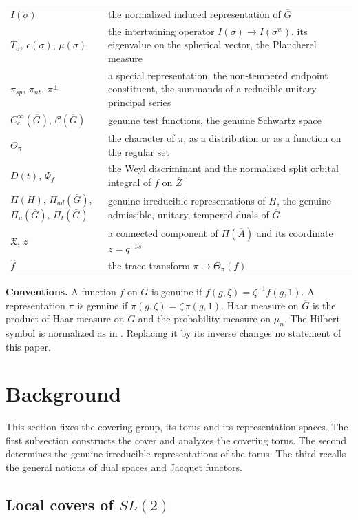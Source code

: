 \documentclass[12pt,letterpaper]{article}
\numberwithin{equation}{section}
\theoremstyle{definition}
\newcommand{\bG}{\overline{G}}
\newcommand{\bA}{\overline{A}}
\newcommand{\bZ}{\overline{Z}}
\newcommand{\calC}{\mathcal C}
\newcommand{\fX}{\mathfrak X}
\newcommand{\Pia}{\Pi_{ad}(\bG)}
\newcommand{\Piu}{\Pi_{u}(\bG)}
\newcommand{\Pit}{\Pi_{t}(\bG)}
\begin{document}
{\begin{longtable}{@{}>{\raggedright}p{4.3cm}>{\raggedright\arraybackslash}p{11.3cm}@{}}
$I(\sigma)$ & the normalized induced representation of $\bG$ \\
$T_\sigma$, $c(\sigma)$, $\mu(\sigma)$ & the intertwining operator $I(\sigma)\to I(\sigma^w)$, its eigenvalue on the spherical vector, the Plancherel measure \\
$\pi_{sp}$, $\pi_{nt}$, $\pi^\pm$ & a special representation, the non-tempered endpoint constituent, the summands of a reducible unitary principal series \\
$C_c^\infty(\bG)$, $\calC(\bG)$ & genuine test functions, the genuine Schwartz space \\
$\Theta_\pi$ & the character of $\pi$, as a distribution or as a function on the regular set \\
$D(t)$, $\Phi_f$ & the Weyl discriminant and the normalized split orbital integral of $f$ on $\bZ$ \\
$\Pi(H)$, $\Pia$, $\Piu$, $\Pit$ & genuine irreducible representations of $H$, the genuine admissible, unitary, tempered duals of $\bG$ \\
$\fX$, $z$ & a connected component of $\Pi(\bA)$ and its coordinate $z=q^{-\nu s}$ \\
$\hat f$ & the trace transform $\pi\mapsto\Theta_\pi(f)$ \\
\bottomrule
\end{longtable}}

\noindent\textbf{Conventions.}  A function $f$ on $\bG$ is genuine if
$f(g,\zeta)=\zeta^{-1}f(g,1)$.  A representation $\pi$ is genuine if
$\pi(g,\zeta)=\zeta\,\pi(g,1)$.  Haar measure on $\bG$ is the product of Haar measure on
$G$ and the probability measure on $\mu_n$.  The Hilbert symbol is normalized as in
\cite{We75}.  Replacing it by its inverse changes no statement of this paper.
\section{Background}\label{sec:background}

This section fixes the covering group, its torus and its representation spaces.  The
first subsection constructs the cover and analyzes the covering torus.  The second
determines the genuine irreducible representations of the torus.  The third recalls the
general notions of dual spaces and Jacquet functors.

\subsection{\texorpdfstring{Local covers of $SL(2)$}{Local covers of SL(2)}}\label{subsec:covers}
\end{document}

